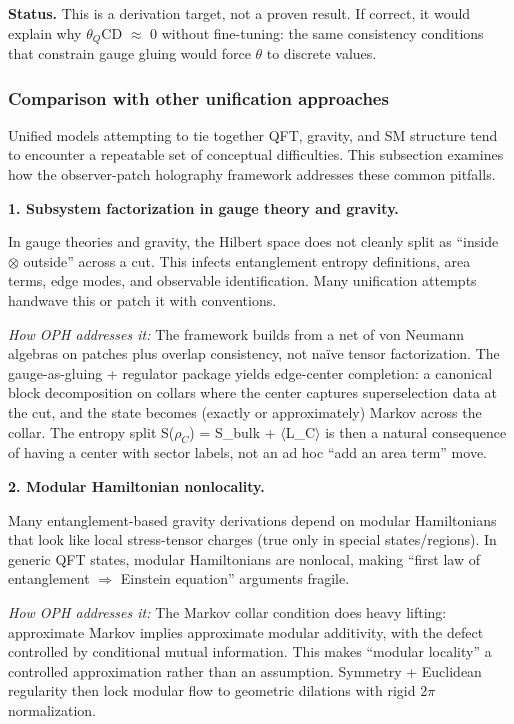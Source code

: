 \documentclass[11pt,a4paper]{article}
\theoremstyle{remark}
\begin{document}
\textbf{Status.} This is a derivation target, not a proven result. If correct, it
would explain why \(\theta{}_Q\)CD \ensuremath{\approx} 0 without fine-tuning: the same consistency
conditions that constrain gauge gluing would force \ensuremath{\theta} to discrete values.

\subsubsection{Comparison with other unification approaches}\label{comparison-with-other-unification-approaches}

Unified models attempting to tie together QFT, gravity, and SM structure tend to encounter a repeatable set of conceptual difficulties. This subsection examines how the observer-patch holography framework addresses these common pitfalls.

\textbf{1. Subsystem factorization in gauge theory and gravity.}

In gauge theories and gravity, the Hilbert space does not cleanly split as ``inside \ensuremath{\otimes} outside'' across a cut. This infects entanglement entropy definitions, area terms, edge modes, and observable identification. Many unification attempts handwave this or patch it with conventions.

\emph{How OPH addresses it:} The framework builds from a net of von Neumann algebras on patches plus overlap consistency, not naïve tensor factorization. The gauge-as-gluing + regulator package yields edge-center completion: a canonical block decomposition on collars where the center captures superselection data at the cut, and the state becomes (exactly or approximately) Markov across the collar. The entropy split S(\(\rho_C\)) = S\_bulk + \ensuremath{\langle}L\_C\ensuremath{\rangle} is then a natural consequence of having a center with sector labels, not an ad hoc ``add an area term'' move.

\textbf{2. Modular Hamiltonian nonlocality.}

Many entanglement-based gravity derivations depend on modular Hamiltonians that look like local stress-tensor charges (true only in special states/regions). In generic QFT states, modular Hamiltonians are nonlocal, making ``first law of entanglement \ensuremath{\Rightarrow} Einstein equation'' arguments fragile.

\emph{How OPH addresses it:} The Markov collar condition does heavy lifting: approximate Markov implies approximate modular additivity, with the defect controlled by conditional mutual information. This makes ``modular locality'' a controlled approximation rather than an assumption. Symmetry + Euclidean regularity then lock modular flow to geometric dilations with rigid 2\ensuremath{\pi} normalization.
\end{document}
